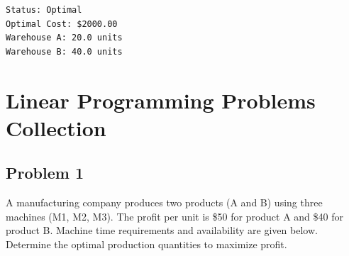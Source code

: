 \documentclass[
  letterpaper,
  DIV=11,
  numbers=noendperiod]{scrreprt}
\newenvironment{Shaded}{\begin{snugshade}}{\end{snugshade}}
\newcommand{\BuiltInTok}[1]{\textcolor[rgb]{0.00,0.23,0.31}{#1}}
\newcommand{\CommentTok}[1]{\textcolor[rgb]{0.37,0.37,0.37}{#1}}
\newcommand{\NormalTok}[1]{\textcolor[rgb]{0.00,0.23,0.31}{#1}}
\newcommand{\SpecialCharTok}[1]{\textcolor[rgb]{0.37,0.37,0.37}{#1}}
\newcommand{\SpecialStringTok}[1]{\textcolor[rgb]{0.13,0.47,0.30}{#1}}
\begin{document}
\begin{Shaded}
\end{Shaded}

\begin{verbatim}
Status: Optimal
Optimal Cost: $2000.00
Warehouse A: 20.0 units
Warehouse B: 40.0 units
\end{verbatim}

\section{Linear Programming Problems
Collection}\label{linear-programming-problems-collection}

\subsection{Problem 1}\label{problem-1}

A manufacturing company produces two products (A and B) using three
machines (M1, M2, M3). The profit per unit is \$50 for product A and
\$40 for product B. Machine time requirements and availability are given
below. Determine the optimal production quantities to maximize profit.
\end{document}
